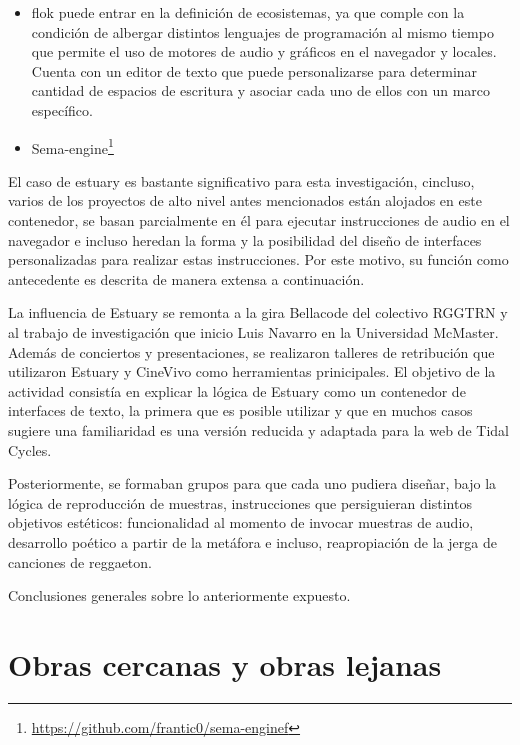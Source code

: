 \begin{itemize}

\item \Gls{flok} puede entrar en la definición de ecosistemas, ya que comple con la condición de albergar distintos lenguajes de programación al mismo tiempo que permite el uso de motores de audio y gráficos en el navegador y locales. Cuenta con un editor de texto que puede personalizarse para determinar cantidad de espacios de escritura y asociar cada uno de ellos con un marco específico. 
\item Sema-engine\footnote{\url{https://github.com/frantic0/sema-enginef}}

\end{itemize}

El caso de \Gls{estuary} es bastante significativo para esta investigación, cincluso, varios de los proyectos de alto nivel antes mencionados están alojados en este contenedor, se basan parcialmente en él para ejecutar instrucciones de audio en el navegador e incluso heredan la forma y la posibilidad del diseño de interfaces personalizadas para realizar estas instrucciones. Por este motivo, su función como antecedente es descrita de manera extensa a continuación. 

La influencia de Estuary se remonta a la gira Bellacode del colectivo RGGTRN y al trabajo de investigación que inicio Luis Navarro en la Universidad McMaster. Además de conciertos y presentaciones, se realizaron talleres de retribución que utilizaron Estuary y CineVivo como herramientas prinicipales. El objetivo de la actividad consistía en explicar la lógica de Estuary como un contenedor de interfaces de texto, la primera que es posible utilizar y que en muchos casos sugiere una familiaridad es una versión reducida y adaptada para la web de Tidal Cycles.

Posteriormente, se formaban grupos para que cada uno pudiera diseñar, bajo la lógica de reproducción de muestras, instrucciones que persiguieran distintos objetivos estéticos: funcionalidad al momento de invocar muestras de audio, desarrollo poético a partir de la metáfora e incluso, reapropiación de la jerga de canciones de reggaeton.\citep{bellacode}

Conclusiones generales sobre lo anteriormente expuesto. 

\section{Obras cercanas y obras lejanas}

